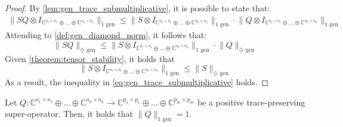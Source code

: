 \begin{proof}
 
  By \autoref{lem:gen_trace_submultiplicative}, it is possible to state that:
\begin{equation}
  \begin{split}
   \lVert S Q \otimes I_{\mathbb{C}^{o_1 \times o_1} \oplus \ldots \oplus \mathbb{C}^{o_n \times o_n}} \rVert_{1\text{ gen}} \leq \lVert S \otimes I_{\mathbb{C}^{o_1 \times o_1} \oplus \ldots \oplus \mathbb{C}^{o_n \times o_n}} \rVert_{1\text{ gen}} \cdot \lVert Q \otimes I_{\mathbb{C}^{o_1 \times o_1} \oplus \ldots \oplus \mathbb{C}^{o_n \times o_n}} \rVert_{1\text{ gen}}  
    \end{split}
\end{equation}
Attending to \autoref{def:gen_diamond_norm}, it follows that:
\begin{equation}
   \lVert S Q \rVert_{\diamondsuit \text{ gen}} \leq  \lVert S \otimes I_{\mathbb{C}^{o_1 \times o_1} \oplus \ldots \oplus \mathbb{C}^{o_n \times o_n}} \rVert_{1\text{ gen}} \cdot \lVert Q \rVert_{\diamondsuit \text{ gen}}
\end{equation}
Given \autoref{theorem:tensor_stability}, it holds that
\begin{equation}
  \lVert S \otimes I_{\mathbb{C}^{o_1 \times o_1} \oplus \ldots \oplus \mathbb{C}^{o_n \times o_n}} \rVert_{1\text{ gen}} \leq \lVert S \rVert_{\diamondsuit \text{ gen}}
\end{equation}
As a result, the inequality in \autoref{eq:gen_trace_submultiplicative} holds.
\end{proof}
 
\begin{lemma} \label{lem:gen_trace_ptp_norm1}
  Let  $Q: \mathbb{C}^{o_1 \times o_1} \oplus \ldots \oplus \mathbb{C}^{o_n \times o_n}  \rightarrow \mathbb{C}^{p_1 \times p_1} \oplus \ldots \oplus  \mathbb{C}^{p_m \times p_m}$ be a positive trace-preserving super-operator. Then, it holds that $\lVert Q \rVert_{1 \text{ gen}} = 1$.
\end{lemma}

